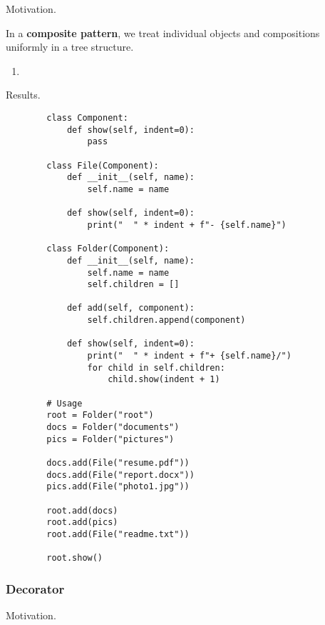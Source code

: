     Motivation. 

    \begin{definition}
      In a \textbf{composite pattern}, we treat individual objects and compositions uniformly in a tree structure. 
      \begin{enumerate}
        \item 
      \end{enumerate}
    \end{definition}

    Results. 

    \begin{example}
      \begin{lstlisting}
        class Component:
            def show(self, indent=0):
                pass

        class File(Component):
            def __init__(self, name):
                self.name = name
            
            def show(self, indent=0):
                print("  " * indent + f"- {self.name}")

        class Folder(Component):
            def __init__(self, name):
                self.name = name
                self.children = []
            
            def add(self, component):
                self.children.append(component)
            
            def show(self, indent=0):
                print("  " * indent + f"+ {self.name}/")
                for child in self.children:
                    child.show(indent + 1)

        # Usage
        root = Folder("root")
        docs = Folder("documents")
        pics = Folder("pictures")

        docs.add(File("resume.pdf"))
        docs.add(File("report.docx"))
        pics.add(File("photo1.jpg"))

        root.add(docs)
        root.add(pics)
        root.add(File("readme.txt"))

        root.show() 
      \end{lstlisting}
    \end{example}

  \subsubsection{Decorator}

    Motivation. 

